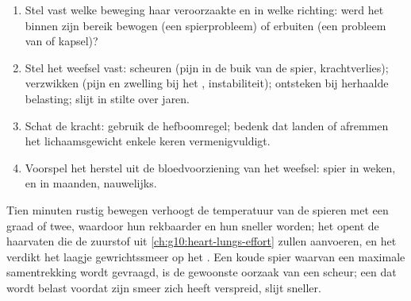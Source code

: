 \begin{method}\label{met:g10:muscles-and-joints:analyse}
\begin{enumerate}
  \item Stel vast welke beweging haar veroorzaakte en in welke richting:
        werd het  binnen zijn bereik bewogen (een spierprobleem)
        of erbuiten (een probleem van  of kapsel)?
  \item Stel het weefsel vast:  scheuren (pijn in de buik van
        de spier, krachtverlies);  verzwikken (pijn en
        zwelling bij het , instabiliteit);  ontsteken bij
        herhaalde belasting;  slijt in stilte over jaren.
  \item Schat de kracht: gebruik de hefboomregel; bedenk dat landen of
        afremmen het lichaamsgewicht enkele keren vermenigvuldigt.
  \item Voorspel het herstel uit de bloedvoorziening van het weefsel:
        spier in weken,  en  in maanden, 
        nauwelijks.
\end{enumerate}
\end{method}

\begin{remark}\label{rem:g10:muscles-and-joints:warmup}
Tien minuten rustig bewegen verhoogt de temperatuur van de spieren met
een graad of twee, waardoor hun  rekbaarder en hun 
sneller worden; het opent de haarvaten die de zuurstof uit
\cref{ch:g10:heart-lungs-effort} zullen aanvoeren, en het verdikt het
laagje gewrichtssmeer op het . Een koude spier waarvan een
maximale samentrekking wordt gevraagd, is de gewoonste oorzaak van een
scheur; een  dat wordt belast voordat zijn smeer zich heeft
verspreid, slijt sneller.
\end{remark}

